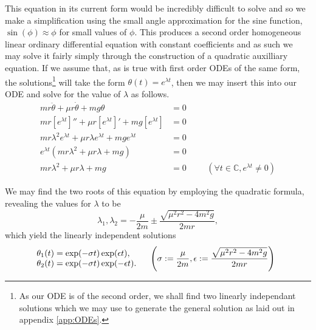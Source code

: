 \documentclass{article}
\begin{document}
This equation in its current form would be incredibly difficult to solve and so we make a simplification using the small angle approximation for the sine function, $\sin(\phi) \approx \phi$ for small values of $\phi$. This produces a second order homogeneous linear ordinary differential equation with constant coefficients and as such we may solve it fairly simply through the construction of a quadratic auxilliary equation. If we assume that, as is true with first order ODEs of the same form, the solutions\footnote{As our ODE is of the second order, we shall find two linearly independant solutions which we may use to generate the general solution as laid out in appendix \ref{app:ODEs}.} will take the form $\theta(t) = e^{\lambda t}$, then we may insert this into our ODE and solve for the value of $\lambda$ as follows.
\begin{align*}
	mr\ddot{\theta} + \mu r\dot{\theta} + mg\theta &= 0 \\
	mr[e^{\lambda t}]'' + \mu r [e^{\lambda t}]' + mg [e^{\lambda t}] &= 0 \\
	mr \lambda^2 e^{\lambda t} + \mu r \lambda e^{\lambda t} + mg e^{\lambda t} &= 0 \\
	e^{\lambda t}\left(mr \lambda ^2 + \mu r \lambda + mg\right) &= 0 \\
	mr \lambda ^2 + \mu r \lambda + mg &= 0 &&& (\forall t \in \mathbb{C}, e^{\lambda t} \neq 0)
\end{align*}

We may find the two roots of this equation by employing the quadratic formula, revealing the values for $\lambda$ to be
\begin{equation*}
	\lambda_1, \lambda_2 = -\frac{\mu}{2m} \pm \frac{\sqrt{\mu^2 r^2 - 4m^2g}}{2mr},
\end{equation*}
which yield the linearly independent solutions
\begin{align}
	\begin{array}{l l}
		\theta_1(t) = \exp(-\sigma t)\exp(\epsilon t), \\
		\theta_2(t) = \exp(-\sigma t)\exp(-\epsilon t).
	\end{array} &&& \left(\sigma := \frac{\mu}{2m}, \epsilon := \frac{\sqrt{\mu^2 r^2 - 4m^2g}}{2mr}\right) \label{eq:pendIndepSols}
\end{align}
\end{document}
